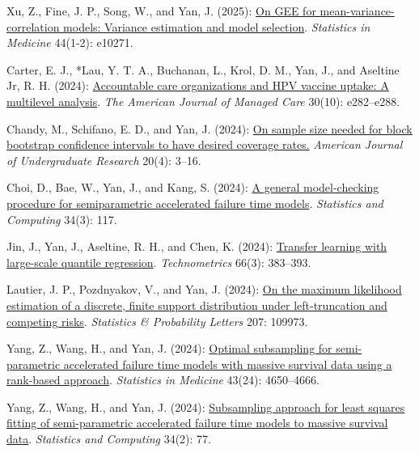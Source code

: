 \begin{RefereedJournalArticles}
\item *Xu, Z., Fine, J. P., Song, W., and Yan, J. (2025):
\href{https://doi.org/10.1002/sim.10271}{On GEE for
mean-variance-correlation models: Variance estimation and model
selection}. \emph{Statistics in Medicine} 44(1-2): e10271.

\item Carter, E. J., *Lau, Y. T. A., Buchanan, L., Krol, D. M.,
Yan, J., and Aseltine Jr, R. H. (2024):
\href{https://doi.org/10.37765/ajmc.2024.89620}{Accountable care
organizations and HPV vaccine uptake: A multilevel analysis}. \emph{The
American Journal of Managed Care} 30(10): e282--e288.

\item *Chandy, M., Schifano, E. D., and Yan, J. (2024):
\href{https://doi.org/10.33697/ajur.2024.101}{On sample size needed for
block bootstrap confidence intervals to have desired coverage rates.}
\emph{American Journal of Undergraduate Research} 20(4): 3--16.

\item Choi, D., Bae, W., Yan, J., and Kang, S. (2024):
\href{https://doi.org/10.1007/s11222-024-10431-7}{A general
model-checking procedure for semiparametric accelerated failure time
models}. \emph{Statistics and Computing} 34(3): 117.

\item *Jin, J., Yan, J., Aseltine, R. H., and Chen, K. (2024):
\href{https://doi.org/10.1080/00401706.2024.2315952}{Transfer learning
with large-scale quantile regression}. \emph{Technometrics} 66(3):
383--393.

\item *Lautier, J. P., Pozdnyakov, V., and Yan, J. (2024):
\href{https://doi.org/10.1016/j.spl.2023.109973}{On the maximum
likelihood estimation of a discrete, finite support distribution under
left-truncation and competing risks}. \emph{Statistics \& Probability
Letters} 207: 109973.

\item *Yang, Z., Wang, H., and Yan, J. (2024):
\href{https://doi.org/10.1002/sim.10200}{Optimal subsampling for
semi-parametric accelerated failure time models with massive survival
data using a rank-based approach}. \emph{Statistics in Medicine} 43(24):
4650--4666.

\item *Yang, Z., Wang, H., and Yan, J. (2024):
\href{https://doi.org/10.1007/s11222-024-10391-y}{Subsampling approach
for least squares fitting of semi-parametric accelerated failure time
models to massive survival data}. \emph{Statistics and Computing} 34(2):
77.


\end{RefereedJournalArticles}
